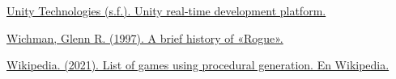 \begin{thebibliography}{1}
	\href{https://unity.com/}{Unity Technologies (s.f.). Unity real-time development platform.}
	
	
	
	\href{https://web.archive.org/web/19990428205231/http://www.wichman.org/roguehistory.html}{Wichman, Glenn R. (1997). A brief history of «Rogue».}
	
	
	\href{https://en.wikipedia.org/w/index.php?title=List_of_games_using_procedural_generation&oldid=1052328409}{	Wikipedia. (2021). List of games using procedural generation. En Wikipedia.}


\end{thebibliography}